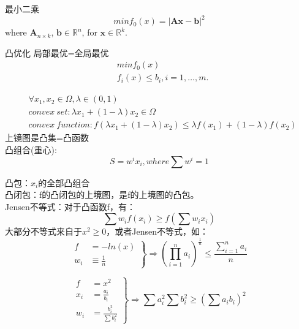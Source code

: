 \documentclass[UTF8]{../computerUniverse}
\begin{document}
最小二乘
\begin{equation}
min f_0(x)=\left| \mathbf {Ax-b} \right|^2
\end{equation}
where $\mathbf A_{n \times k}$, $\mathbf b\in \mathbb R^n$, for $\mathbf x\in \mathbb R^k$.

凸优化 局部最优=全局最优
\begin{equation}
    \begin{split}
    &minf_0(x) \\
    &f_i(x) \leqslant b_i,i=1,\dots,m.
    \end{split}
\end{equation} 

\begin{equation}
\begin{split}
&\forall x_1,x_2 \in \Omega,\lambda \in (0,1)\\
&convex \ set: \lambda x_1 +(1-\lambda)x_2 \in \Omega\\
&convex \ function: f \left( \lambda x_1+(1-\lambda)x_2 \right)\leqslant
\lambda f(x_1)+(1-\lambda)f(x_2)
\end{split}
\end{equation}
上镜图是凸集=凸函数\\   

凸组合(重心):
\begin{equation}
S=w^ix_i, where \sum w^i=1
\end{equation} 

凸包：$x_i$的全部凸组合\\
凸闭包：f的凸闭包的上境图，是f的上境图的凸包。\\
Jensen不等式：对于凸函数f，有：
\begin{equation}
\sum w_if \left( x_i \right)\geqslant f \left( \sum w_ix_i \right)
\end{equation}
大部分不等式来自于$ x^2\geqslant0$，或者Jensen不等式，如：
\begin{equation}
\left.
\begin{aligned}
f&=-ln(x) \\
w_i& \equiv \frac{1}{n}
\end{aligned}
 \right\} \Rightarrow
 \left( \prod_{i=1}^{n} a_i  \right)^{\frac{1}{n}}\leqslant \frac{\sum\limits_{i=1}^na_i}{n}
\end{equation}

\begin{equation}
    \left.
    \begin{aligned}
    f&=x^2 \\
    x_i&=\frac{a_i}{b_i} \\
    w_i&=\frac{b_i^2}{\sum b_i^2}
    \end{aligned}
     \right\} \Rightarrow
     \sum a_i^2 \sum b_i^2 \geqslant \left( \sum a_ib_i \right)^2
\end{equation}
\end{document}
